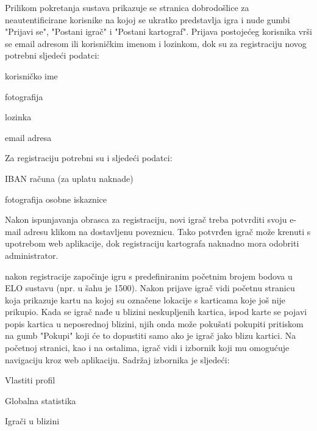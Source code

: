 		
		Prilikom pokretanja sustava prikazuje se stranica dobrodošlice za neautentificirane korisnike na kojoj se ukratko predstavlja igra i nude gumbi "Prijavi se", "Postani igrač" i "Postani kartograf".  Prijava postojećeg korisnika vrši se email adresom ili korisničkim imenom i lozinkom, dok su za registraciju novog  potrebni sljedeći podatci:
		\begin{packed_item}
		    \item korisničko ime
		    \item fotografija
		    \item lozinka
		    \item email adresa
		\end{packed_item}
		
		Za registraciju  potrebni su i sljedeći podatci:
		\begin{packed_item}
		    \item IBAN računa (za uplatu naknade)
		    \item fotografija osobne iskaznice
		\end{packed_item}
		
		Nakon ispunjavanja obrasca za registraciju, novi igrač treba potvrditi svoju e-mail adresu klikom na dostavljenu poveznicu. Tako potvrđen igrač može krenuti s upotrebom web aplikacije, dok registraciju kartografa naknadno mora odobriti administrator.
		
		 nakon registracije započinje igru s predefiniranim početnim brojem bodova u ELO sustavu (npr. u šahu je 1500). Nakon prijave igrač vidi početnu stranicu koja prikazuje kartu na kojoj su označene lokacije s karticama koje još nije prikupio. Kada se igrač nađe u blizini neskupljenih kartica, ispod karte se pojavi popis kartica u neposrednoj blizini, njih onda može pokušati pokupiti pritiskom na gumb "Pokupi" koji će to dopustiti samo ako je igrač jako blizu kartici. Na početnoj stranici, kao i na ostalima, igrač vidi i izbornik koji mu omogućuje navigaciju kroz web aplikaciju. Sadržaj izbornika je sljedeći:
		
		\begin{packed_item}
		    \item Vlastiti profil
		    \item Globalna statistika
		    \item Igrači u blizini
		\end{packed_item}
		
